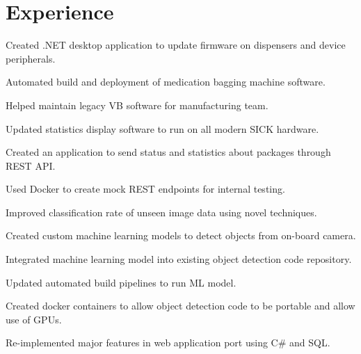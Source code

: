 \documentclass[]{deedy-resume-openfont}
\begin{document}

\section{Experience}

\hfill {}
\begin{tightemize}
    \item Created .NET desktop application to update firmware on dispensers and device peripherals.
    \item Automated build and deployment of medication bagging machine software.
    \item Helped maintain legacy VB software for manufacturing team.
\end{tightemize}
\sectionsep

\hfill {}
\begin{tightemize}
    \item Updated statistics display software to run on all modern SICK hardware.
    \item Created an application to send status and statistics about packages through REST API.
    \item Used Docker to create mock REST endpoints for internal testing.
\end{tightemize}
\sectionsep

\hfill {}
\begin{tightemize}
    \item Improved classification rate of unseen image data using novel techniques.
    \item Created custom machine learning models to detect objects from on-board camera.
    \item Integrated machine learning model into existing object detection code repository.
    \item Updated automated build pipelines to run ML model.
    \item Created docker containers to allow object detection code to be portable and allow use of GPUs.
    \item Re-implemented major features in web application port using C\# and SQL.
\end{tightemize}
\sectionsep
\end{document}
